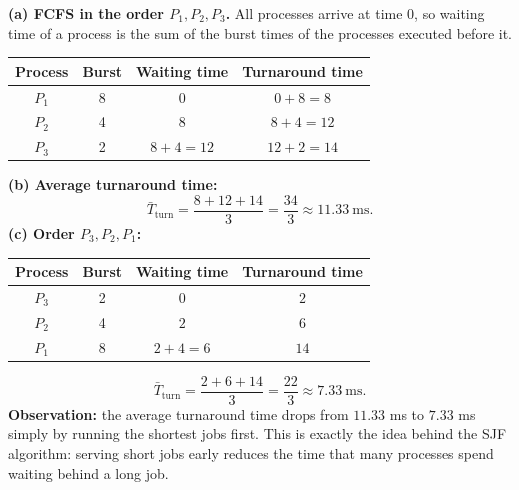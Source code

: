 \documentclass[11pt]{article}
\newcommand{\cle}[1]{{\popxbold\color{popdark}#1}}
\begin{document}
\begin{corrige}
\textbf{(a) FCFS in the order $P_1, P_2, P_3$.} All processes arrive at time $0$, so waiting time of a process is the sum of the burst times of the processes executed before it.
\begin{center}
\begin{tabular}{|c|c|c|c|}
\hline
\rowcolor{popblueL} Process & Burst & Waiting time & Turnaround time \\
\hline
$P_1$ & 8 & $0$ & $0+8=8$ \\
\hline
$P_2$ & 4 & $8$ & $8+4=12$ \\
\hline
$P_3$ & 2 & $8+4=12$ & $12+2=14$ \\
\hline
\end{tabular}
\end{center}
\textbf{(b) Average turnaround time:}
\[ \bar{T}_{\text{turn}} = \frac{8+12+14}{3} = \frac{34}{3} \approx 11.33\ \text{ms}. \]
\textbf{(c) Order $P_3, P_2, P_1$:}
\begin{center}
\begin{tabular}{|c|c|c|c|}
\hline
\rowcolor{popblueL} Process & Burst & Waiting time & Turnaround time \\
\hline
$P_3$ & 2 & $0$ & $2$ \\
\hline
$P_2$ & 4 & $2$ & $6$ \\
\hline
$P_1$ & 8 & $2+4=6$ & $14$ \\
\hline
\end{tabular}
\end{center}
\[ \bar{T}_{\text{turn}} = \frac{2+6+14}{3} = \frac{22}{3} \approx 7.33\ \text{ms}. \]
\textbf{Observation:} the average turnaround time drops from $11.33$ ms to $7.33$ ms simply by running the shortest jobs first. This is exactly the idea behind the \cle{SJF} algorithm: serving short jobs early reduces the time that many processes spend waiting behind a long job.
\end{corrige}
\end{document}
